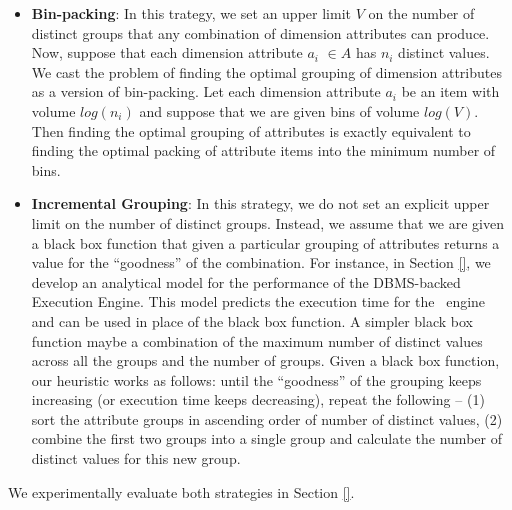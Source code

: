   \begin{itemize} 
  \item {\bf Bin-packing}: In this trategy, we set an upper limit $V$ on the
  number of distinct groups that any combination of dimension attributes can
  produce.
  Now, suppose that each dimension attribute $a_i$ $\in A$ has $n_i$ distinct
  values.
  We cast the problem of finding the optimal grouping of dimension attributes as
  a version of bin-packing.
  Let each dimension attribute $a_i$ be an item with volume $log(n_i)$ and
  suppose that we are given bins of volume $log(V)$.
  Then finding the optimal grouping of attributes is exactly equivalent to
  finding the optimal packing of attribute items into the minimum number of
  bins.
  \item {\bf Incremental Grouping}: In this strategy, we do not set an
  explicit upper limit on the number of distinct groups. 
  Instead, we assume that
  we are given a black box function that given a particular grouping of
  attributes returns a value for the ``goodness'' of the combination. 
  For instance, in
  Section \ref{}, we develop an analytical model for the performance of the
  DBMS-backed Execution Engine. 
  This model predicts the execution time for the
  \SeeDB\ engine and can be used in place of the black box function. 
  A simpler
  black box function maybe a combination of the maximum number of distinct
  values across all the groups and the number of groups. 
  Given a black box
  function, our heuristic works as follows: until the ``goodness'' of the
  grouping keeps increasing (or execution time keeps decreasing), repeat the
  following -- (1) sort the attribute groups in ascending order of number of
  distinct values, (2) combine the first two groups into a single group and
  calculate the number of distinct values for this new group.
\end{itemize} 
We experimentally evaluate both strategies in Section \ref{}. 
